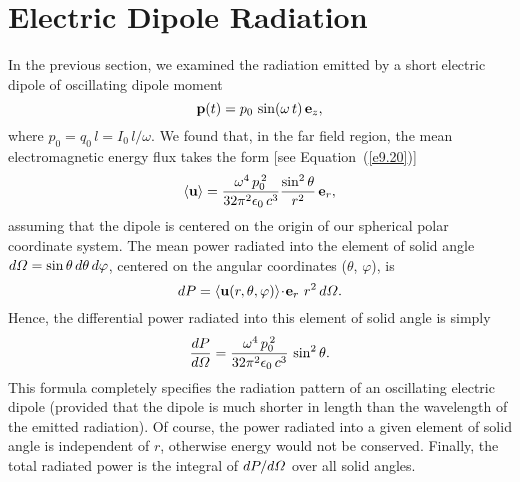 \section{Electric Dipole Radiation}
In the previous section, we examined the radiation emitted by a short electric dipole of oscillating dipole moment
\begin{equation}
{\bf p}(t) = p_0\,\sin(\omega\,t)\,{\bf e}_z,
\end{equation}
where $p_0= q_0\,l=I_0\,l/\omega$. We found that, in the far field region, the mean
electromagnetic energy flux takes the form [see Equation~(\ref{e9.20})]
\begin{equation}
\langle {\bf u}\rangle = \frac{\omega^4\,p_0^{\,2}}{32\pi^2\epsilon_0\,c^3}\frac{\sin^2\theta}{r^2}\,{\bf e}_r,
\end{equation}
assuming that the dipole is centered on the origin of our spherical polar coordinate system.
The mean power radiated into the element of solid angle $d{\mit\Omega} = \sin\theta\,d\theta\,d\varphi$, centered on the angular coordinates ($\theta$, $\varphi$),
is 
\begin{equation}
dP = \langle {\bf u}(r, \theta, \varphi)\rangle\!\cdot\!{{\bf e}_r}\,\,r^2\,d{\mit\Omega}.
\end{equation}
Hence, the differential power radiated into this element of solid angle is
simply
\begin{equation}\label{e9.45}
\frac{dP}{d{\mit\Omega}} = \frac{\omega^4\,p_0^{\,2}}{32\pi^2\epsilon_0\,c^3}\,\sin^2\theta.
\end{equation}
This formula completely specifies the radiation pattern of an oscillating electric dipole (provided that the dipole is much shorter in length than the
wavelength of the emitted radiation). Of course, the power radiated into
a given element of solid angle is independent of $r$, otherwise energy would not be conserved. Finally, the total radiated power  is the integral of
$dP/d{\mit\Omega}$ over all solid angles.

